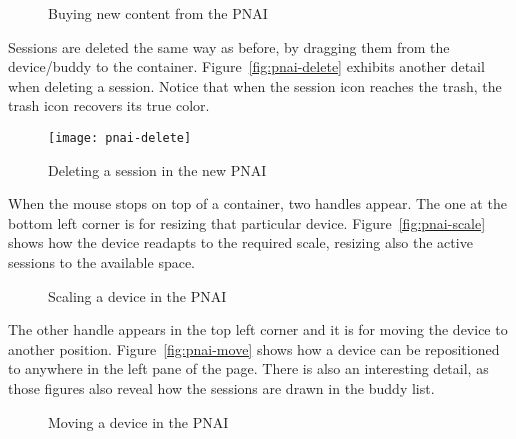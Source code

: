\begin{figure}[htbp]
  \centering
  \caption{Buying new content from the PNAI}
  \label{fig:pnai-buy-content}
\end{figure}

Sessions are deleted the same way as before, by dragging them from the device/buddy to the container.
Figure~\vref{fig:pnai-delete} exhibits another detail when deleting a session.
Notice that when the session icon reaches the trash, the trash icon recovers its true color.

\begin{figure}[htbp]
  \centering
    \texttt{[image: pnai-delete]}
  \caption{Deleting a session in the new PNAI}
  \label{fig:pnai-delete}
\end{figure}

When the mouse stops on top of a container, two handles appear.
The one at the bottom left corner is for resizing that particular device.
Figure~\vref{fig:pnai-scale} shows how the device readapts to the required scale, resizing also the active sessions to the available space.

\begin{figure}[htbp]
  \centering
  \caption{Scaling a device in the PNAI}
  \label{fig:pnai-scale}
\end{figure}

The other handle appears in the top left corner and it is for moving the device to another position.
Figure~\vref{fig:pnai-move} shows how a device can be repositioned to anywhere in the left pane of the page.
There is also an interesting detail, as those figures also reveal how the sessions are drawn in the buddy list.

\begin{figure}[htbp]
  \centering
  \caption{Moving a device in the PNAI}
  \label{fig:pnai-move}
\end{figure}


